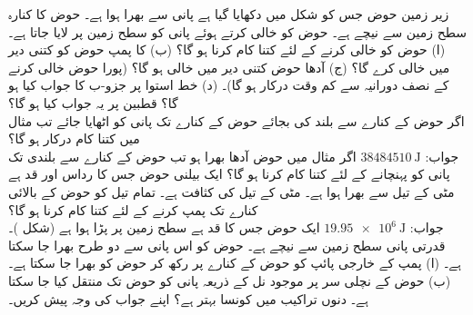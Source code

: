  زیر زمین حوض جس کو شکل  میں دکھایا گیا ہے پانی سے بھرا ہوا ہے۔ حوض کا کنارہ سطح زمین سے  نیچے ہے۔ حوض کو خالی کرتے ہوئے  پانی کو سطح زمین پر لایا جاتا ہے۔(ا) حوض کو خالی کرنے کے لئے کتنا کام کرنا ہو گا؟ (ب)   کا پمپ حوض کو کتنی دیر میں خالی کرے گا؟ (ج) آدھا حوض کتنی دیر میں خالی ہو گا؟ (پورا حوض خالی کرنے کے نصف دورانیہ سے کم وقت درکار ہو گا)۔ (د) خط استوا پر جزو-ب کا جواب کیا ہو گا؟ قطبین پر یہ جواب کیا ہو گا؟\\
اگر حوض کے کنارے سے  بلند کی بجائے حوض کے کنارے تک پانی کو اٹھایا جائے تب مثال  میں کتنا کام درکار ہو گا؟\\
جواب:\quad
$\SI{38484510}{\joule}$
اگر مثال  میں حوض آدھا بھرا ہو تب حوض کے کنارے سے  بلندی تک پانی کو پہنچانے کے لئے کتنا کام کرنا ہو گا؟
ایک بیلنی حوض جس کا رداس  اور قد  ہے مٹی کے تیل سے بھرا ہوا ہے۔ مٹی کے تیل کی کثافت  ہے۔ تمام تیل کو حوض کے بالائی کنارے تک پمپ  کرنے کے لئے کتنا کام کرنا ہو گا؟\\
جواب:\quad
$\SI{19.95e6}{\joule}$
ایک حوض جس کا قد  ہے سطح زمین پر پڑا ہوا ہے (شکل )۔قدرتی پانی  سطح زمین سے  نیچے ہے۔ حوض کو اس پانی سے دو طرح بھرا جا سکتا ہے۔ (ا) پمپ کے خارجی پائپ کو حوض کے کنارے پر رکھ کر حوض کو بھرا جا سکتا ہے۔ (ب) حوض کے نچلی سر پر  موجود نل کے ذریعہ پانی کو حوض تک منتقل کیا جا سکتا ہے۔ دنوں تراکیب میں کونسا بہتر ہے؟ اپنے جواب کی وجہ پیش کریں۔     
